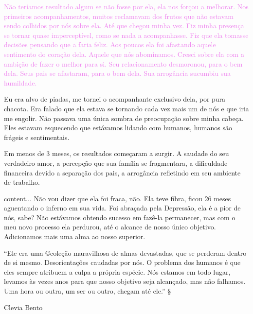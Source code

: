 \documentclass{book}
\begin{document}
\begin{multicols}{2}
	\textcolor{violet}{ Não teríamos resultado algum se não fosse por ela, ela nos forçou a melhorar. Nos primeiros acompanhamentos, muitos reclamavam dos frutos que não estavam sendo colhidos por nós sobre ela. Até que chegou minha vez. Fiz minha presença se tornar quase imperceptível, como se nada a acompanhasse. Fiz que ela tomasse decisões pensando que a faria feliz. Aos poucos ela foi afastando aquele sentimento do coração dela. Aquele que nós abominamos. Cresci sobre ela com a ambição de fazer o melhor para si. Seu relacionamento desmoronou, para o bem dela. Seus pais se afastaram, para o bem dela. Sua arrogância sucumbiu sua humildade.} 
\end{multicols}

	\begin{flushleft} Eu era alvo de piadas, me tornei o acompanhante exclusivo dela, por pura chacota. Era falado que ela estava se tornando cada vez mais um de nós e que iria me engolir. Não passava uma única sombra de preocupação sobre minha cabeça. Eles estavam esquecendo que estávamos lidando com humanos, humanos são frágeis e sentimentais.
\end{flushleft}	

	\begin{flushright} Em menos de 3 meses, os resultados começaram a surgir. A saudade do seu verdadeiro amor, a percepção que sua família se fragmentara, a dificuldade financeira devido a separação dos pais, a arrogância refletindo em seu ambiente de trabalho.
\end{flushright}

\begin{center}
	content...	Não vou dizer que ela foi fraca, não. Ela teve fibra, ficou 26 meses aguentando o inferno em sua vida. Foi abraçada pela Depressão, ela é a pior de nós, sabe? Não estávamos obtendo sucesso em fazê-la permanecer, mas com o meu novo processo ela perdurou, até o alcance de nosso único objetivo. Adicionamos mais uma alma ao nosso superior.
\end{center} 
	``Ele era uma \copyright coleção maravilhosa de almas devastadas, que se perderam dentro de si mesmo. \textregistered Desorientações caudadas por nós. O problema dos humanos é que eles sempre atribuem a culpa a própria espécie. Nós estamos em todo lugar, levamos às vezes anos para que nosso objetivo seja alcançado, mas não falhamos. Uma hora ou outra, um ser ou outro, chegam até ele.''
\S
\dag	
\ddag

{\color[rgb]{0.44,0,0.11}Clevia Bento }
\end{document}
